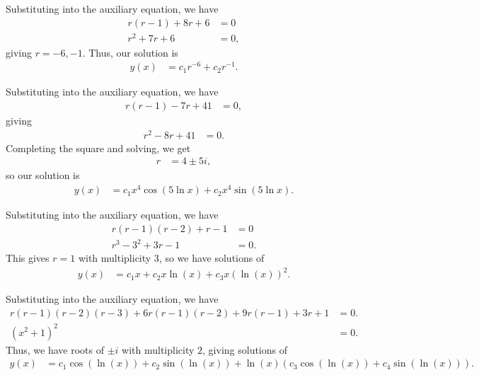 \documentclass[12pt]{mypackage}
\begin{document}
\begin{solution}[4.7, Problem 12]
  Substituting into the auxiliary equation, we have
  \begin{align*}
    r\left( r-1 \right) + 8r + 6 &= 0\\
    r^2 + 7r + 6 &= 0,
  \end{align*}
  giving $r = -6,-1$. Thus, our solution is
  \begin{align*}
    y(x) &= c_1r^{-6} + c_2r^{-1}.
  \end{align*}
\end{solution}
\begin{solution}[4.7, Problem 14]
  Substituting into the auxiliary equation, we have
  \begin{align*}
    r\left( r-1 \right) - 7r + 41 &= 0,
  \end{align*}
  giving
  \begin{align*}
    r^2 - 8r + 41 &= 0.
  \end{align*}
  Completing the square and solving, we get
  \begin{align*}
    r &= 4\pm 5i,
  \end{align*}
  so our solution is
  \begin{align*}
    y(x) &= c_1x^4\cos\left( 5\ln x \right) + c_2x^4\sin\left( 5\ln x \right).
  \end{align*}
\end{solution}
\begin{solution}[4.7, Problem 16]
  Substituting into the auxiliary equation, we have
  \begin{align*}
    r\left( r-1 \right)\left( r-2 \right) + r - 1 &= 0\\
    r^3 - 3^2 + 3r - 1 &= 0.
  \end{align*}
  This gives $r = 1$ with multiplicity $3$, so we have solutions of
  \begin{align*}
    y(x) &= c_1 x + c_2x\ln (x) + c_3x\left( \ln(x) \right)^2.
  \end{align*}
\end{solution}
\begin{solution}[4.7, Problem 18]
  Substituting into the auxiliary equation, we have
  \begin{align*}
    r\left( r-1 \right)\left( r-2 \right)\left( r-3 \right) + 6r\left( r-1 \right)\left( r-2 \right) + 9r\left( r-1 \right) + 3r + 1 &= 0.\\
    \left( x^2 + 1 \right)^2 &= 0.
  \end{align*}
  Thus, we have roots of $\pm i$ with multiplicity $2$, giving solutions of
  \begin{align*}
    y(x) &= c_1\cos\left( \ln(x) \right) + c_2\sin\left( \ln\left( x \right) \right) + \ln\left( x \right)\left( c_3\cos\left( \ln(x) \right) + c_4\sin\left( \ln(x) \right) \right).
  \end{align*}
\end{solution}
\end{document}
